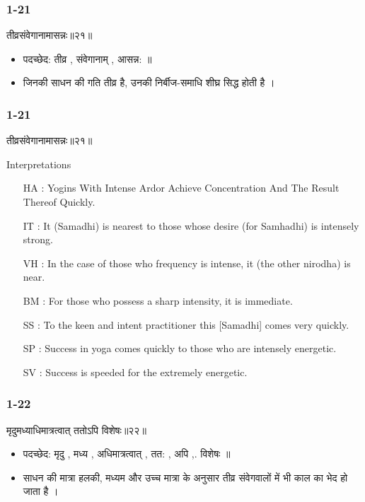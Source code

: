 \begin{frame}[fragile]\frametitle{1-21}
\begin{sanskrit}
तीव्रसंवेगानामासन्नः॥२१॥
\end{sanskrit}

\begin{itemize}
\item पदच्छेद: तीव्र , संवेगानाम् , आसन्न: ॥
\item जिनकी साधन की गति तीव्र है, उनकी निर्बीज-समाधि शीघ्र सिद्ध होती है ।
\end{itemize}
	
\end{frame}



\begin{frame}[fragile]\frametitle{1-21}
\begin{sanskrit}
तीव्रसंवेगानामासन्नः॥२१॥
\end{sanskrit}

Interpretations
\begin{itemize}		
\item [HA]: Yogins With Intense Ardor Achieve Concentration And The Result Thereof Quickly.
\item [IT]: It (Samadhi) is nearest to those whose desire (for Samhadhi) is intensely strong.
\item [VH]: In the case of those who frequency is intense, it (the other nirodha) is near.
\item [BM]: For those who possess a sharp intensity, it is immediate.
\item [SS]: To the keen and intent practitioner this [Samadhi] comes very quickly.
\item [SP]: Success in yoga comes quickly to those who are intensely energetic.
\item [SV]: Success is speeded for the extremely energetic.
\end{itemize}
	
\end{frame}


\begin{frame}[fragile]\frametitle{1-22}
\begin{sanskrit}
मृदुमध्याधिमात्रत्वात् ततोऽपि विशेषः॥२२॥
\end{sanskrit}

\begin{itemize}
\item पदच्छेद: मृदु , मध्य , अधिमात्रत्वात् , तत: , अपि ,. विशेषः ॥
\item साधन की मात्रा हलकी, मध्यम और उच्च मात्रा के अनुसार तीव्र संवेगवालों में भी काल का भेद हो जाता है ।
\end{itemize}
	
\end{frame}

